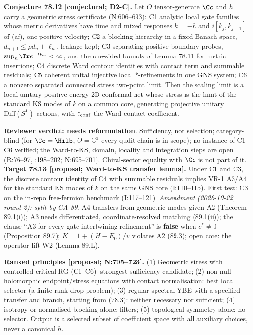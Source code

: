 \textbf{Conjecture 78.12 [conjectural; D2-C].}  Let \(O\) tensor-generate \(\Cc\) and \(h\) carry a
geometric stress certificate (N:606--693): C1 analytic local gate families whose metric derivatives
have time and mixed responses \(k=-h\) and \(i[k_j,k_{j+1}]\) of (af), one positive velocity; C2 a
blocking hierarchy in a fixed Banach space, \(d_{n+1}\le\rho d_n+\ell_n\), leakage kept; C3
separating positive boundary probes, \(\sup_n\Tr e^{-tE_n}<\infty\), and the one-sided bounds of
Lemma 78.11 for metric insertions; C4 discrete Ward contour identities with contact term and
summable residuals; C5 coherent unital injective local \(*\)-refinements in one GNS system; C6 a
nonzero separated connected stress two-point limit.  Then the scaling limit is a local unitary
positive-energy 2D conformal net whose stress is the limit of the standard KS modes of \(k\) on a
common core, generating projective unitary \(\mathrm{Diff}(S^1)\) actions, with \(c_{\rm conf}\) the
Ward contact coefficient.

\textbf{Reviewer verdict: needs reformulation.}  Sufficiency, not selection; category-blind (for
\(\Cc=\Hilb\), \(O=\mathbb C^n\) every qudit chain is in scope); no instance of C1--C6 verified; the
Ward-to-KS, domain, locality and integration steps are open (R:76--97, :198--202; N:695--701).
Chiral-sector equality with \(\Cc\) is not part of it.  \textbf{Target 78.13 [proposal; Ward-to-KS
transfer lemma].}  Under C1 and C3, the discrete contour identity of C4 with summable residuals
implies VR-1 A3/A4 for the standard KS modes of \(k\) on the same GNS core (I:110--115).  First
test: C3 on the in-repo free-fermion benchmark (I:117--121).  \emph{Amendment (2026-10-22, round 2): split by CA-89.}  A4 transfers
from geometric modes given A2 (Theorem 89.1(i)); A3 needs differentiated, coordinate-resolved matching (89.1(ii)); the clause ``A3 for every
gate-intertwining refinement'' is \textbf{false} when \(c^*\neq0\) (Proposition 89.7); \(K=1+(H-E_0)/v\) violates A2 (89.3); open core: the operator lift W2 (Lemma 89.L).

\textbf{Ranked principles [proposal; N:705--723].}  (1) Geometric stress with controlled critical RG
(C1--C6): strongest sufficiency candidate; (2) non-null holomorphic endpoint/stress equations with
contact normalisation: best local selector (a finite rank-drop problem); (3) regular spectral YBE
with a specified transfer and branch, starting from (78.3): neither necessary nor sufficient; (4)
isotropy or normalised blocking alone: filters; (5) topological symmetry alone: no selector.  Output
is a selected subset of coefficient space with all auxiliary choices, never a canonical \(h\).

